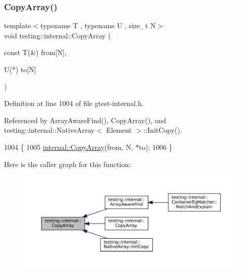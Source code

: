 \subsubsection{\texorpdfstring{Copy\+Array()}{CopyArray()}\hspace{0.1cm}{\footnotesize\ttfamily [3/3]}}
{\footnotesize\ttfamily template$<$typename T , typename U , size\+\_\+t N$>$ \\
void testing\+::internal\+::\+Copy\+Array (\begin{DoxyParamCaption}\item[{const T(\&)}]{from\mbox{[}\+N\mbox{]},  }\item[{U($\ast$)}]{to\mbox{[}\+N\mbox{]} }\end{DoxyParamCaption})\hspace{0.3cm}{\ttfamily [inline]}}



Definition at line 1004 of file gtest-\/internal.\+h.



Referenced by Array\+Aware\+Find(), Copy\+Array(), and testing\+::internal\+::\+Native\+Array$<$ Element $>$\+::\+Init\+Copy().


\begin{DoxyCode}
1004                                                     \{
1005   \hyperlink{namespacetesting_1_1internal_a1e7ae855686720615dcd5754c8181c62}{internal::CopyArray}(from, N, *to);
1006 \}
\end{DoxyCode}
Here is the caller graph for this function\+:
\nopagebreak
\begin{figure}[H]
\begin{center}
\leavevmode
\includegraphics[width=350pt]{namespacetesting_1_1internal_a1e7ae855686720615dcd5754c8181c62_icgraph}
\end{center}
\end{figure}
\mbox{\label{namespacetesting_1_1internal_a9372c12747bcf964aacb1284f8048cae}} 
